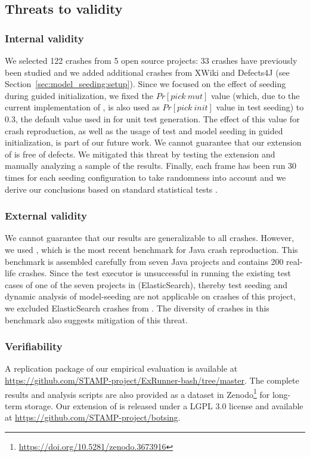 
\subsection{Threats to validity}\label{sec:model_seeding:ttvalidity}

\subsubsection{Internal validity}
We selected 122 crashes from 5 open source projects: 33 crashes have previously been studied \cite{Soltani2018b} and we added additional crashes from XWiki and Defects4J (see Section~\ref{sec:model_seeding:setup}). 
%
Since we focused on the effect of seeding during guided initialization, we fixed the $Pr[pick\ mut]$ value (which, due to the current implementation of \botsing, is also used as $Pr[pick\ init]$ value in test seeding) to 0.3, the default value used in \evosuite for unit test generation. The effect of this value for crash reproduction, as well as the usage of test and model seeding in guided initialization, is part of our future work.
%
We cannot guarantee that our extension of \botsing is free of defects. We mitigated this threat by testing the extension and manually analyzing a sample of the results.
%
Finally, each frame has been run 30 times for each seeding configuration to take randomness into account and we derive our conclusions based on standard statistical tests \cite{Arcuri2014,Panichella2017c}.

\subsubsection{External validity}
We cannot guarantee that our results are generalizable to all crashes. However, we used \jcrashpack, which is the most recent benchmark for Java crash reproduction. This benchmark is assembled carefully from seven Java projects and contains 200 real-life crashes. Since the \evosuite test executor is unsuccessful in running the existing test cases of one of the seven projects in \jcrashpack (ElasticSearch), thereby test seeding and dynamic analysis of model-seeding are not applicable on crashes of this project, we excluded ElasticSearch crashes from \jcrashpack. The diversity of crashes in this benchmark also suggests mitigation of this threat.

\subsubsection{Verifiability} 
A replication package of our empirical evaluation is available at \url{https://github.com/STAMP-project/ExRunner-bash/tree/master}. The complete results and analysis scripts are also provided as a dataset in Zenodo\footnote{\url{https://doi.org/10.5281/zenodo.3673916}} for long-term storage. Our extension of \botsing is released under a LGPL 3.0 license and available at \url{https://github.com/STAMP-project/botsing}.




